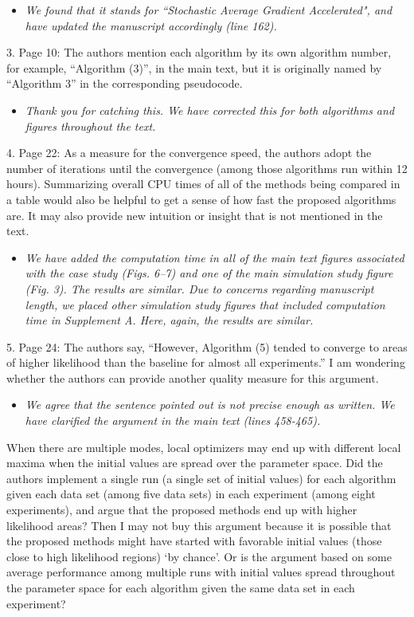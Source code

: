 \documentclass[11pt]{article}
\begin{document}
\begin{itemize}
    \item \textit{We found that it stands for ``Stochastic Average Gradient Accelerated", and have updated the manuscript accordingly (line 162).}
\end{itemize}

3. Page 10: The authors mention each algorithm by its own algorithm number, for example, ``Algorithm (3)”, in the main text, but it is originally named by ``Algorithm 3” in the corresponding pseudocode.

\begin{itemize}
    \item \textit{Thank you for catching this. We have corrected this for both algorithms and figures throughout the text.}
\end{itemize}

4. Page 22: As a measure for the convergence speed, the authors adopt the number of iterations until the convergence (among those algorithms run within 12 hours). Summarizing overall CPU times of all of the methods being compared in a table would also be helpful to get a sense of how fast the proposed algorithms are. It may also provide new intuition or insight that is not mentioned in the text.

\begin{itemize}
    \item \textit{We have added the computation time in all of the main text figures associated with the case study (Figs. 6--7) and one of the main simulation study figure (Fig. 3). The results are similar. Due to concerns regarding manuscript length, we placed other simulation study figures that included computation time in Supplement A. Here, again, the results are similar.}
\end{itemize}

5. Page 24: The authors say, “However, Algorithm (5) tended to converge to areas of higher likelihood than the baseline for almost all experiments.” I am wondering whether the authors can provide another quality measure for this argument.

\begin{itemize}
    \item \textit{We agree that the sentence pointed out is not precise enough as written. We have clarified the argument in the main text (lines 458-465).}
\end{itemize}

When there are multiple modes, local optimizers may end up with different local maxima when the initial values are spread over the parameter space. Did the authors implement a single run (a single set of initial values) for each algorithm given each data set (among five data sets) in each experiment (among eight experiments), and argue that the proposed methods end up with higher likelihood areas? Then I may not buy this argument because it is possible that the proposed methods might have started with favorable initial values (those close to high likelihood regions) ‘by chance’. Or is the argument based on some average performance among multiple runs with initial values spread throughout the parameter space for each algorithm given the same data set in each experiment?
\end{document}
